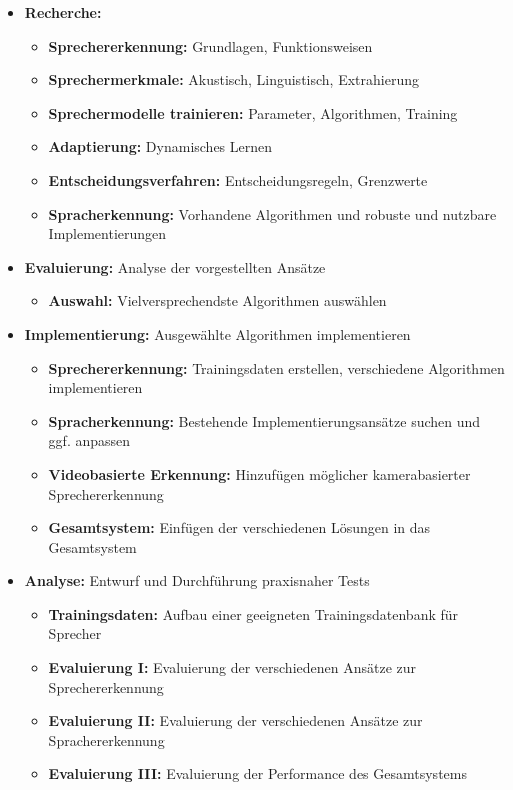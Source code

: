 \documentclass[lang=ngerman,inputenc=utf8,fontsize=10pt]{ldvarticle}
\begin{document}
\begin{itemize}
	\item \textbf{Recherche:}
		\begin{itemize}
			\item \textbf{Sprechererkennung:} Grundlagen, Funktionsweisen
			\item \textbf{Sprechermerkmale:} Akustisch, Linguistisch, Extrahierung
			\item \textbf{Sprechermodelle trainieren:} Parameter, Algorithmen, Training
			\item \textbf{Adaptierung:} Dynamisches Lernen
			\item \textbf{Entscheidungsverfahren:} Entscheidungsregeln, Grenzwerte
			\item \textbf{Spracherkennung:} Vorhandene Algorithmen und robuste und nutzbare Implementierungen
		\end{itemize}
	\item \textbf{Evaluierung:} Analyse der vorgestellten Ansätze
		\begin{itemize}
			\item \textbf{Auswahl:} Vielversprechendste Algorithmen auswählen
		\end{itemize}
	\item \textbf{Implementierung:} Ausgewählte Algorithmen implementieren
		\begin{itemize}
			\item \textbf{Sprechererkennung:} Trainingsdaten erstellen, verschiedene Algorithmen implementieren
			\item \textbf{Spracherkennung:} Bestehende Implementierungsansätze suchen und ggf. anpassen
			\item \textbf{Videobasierte Erkennung:} Hinzufügen möglicher kamerabasierter Sprechererkennung
			\item \textbf{Gesamtsystem:} Einfügen der verschiedenen Lösungen in das Gesamtsystem
		\end{itemize}
	\item \textbf{Analyse:} Entwurf und Durchführung praxisnaher Tests
		\begin{itemize}
			\item \textbf{Trainingsdaten:} Aufbau einer geeigneten Trainingsdatenbank für Sprecher
			\item \textbf{Evaluierung I:} Evaluierung der verschiedenen Ansätze zur Sprechererkennung
			\item \textbf{Evaluierung II:} Evaluierung der verschiedenen Ansätze zur Sprachererkennung
			\item \textbf{Evaluierung III:} Evaluierung der Performance des Gesamtsystems

\end{itemize}
\end{itemize}
\end{document}
